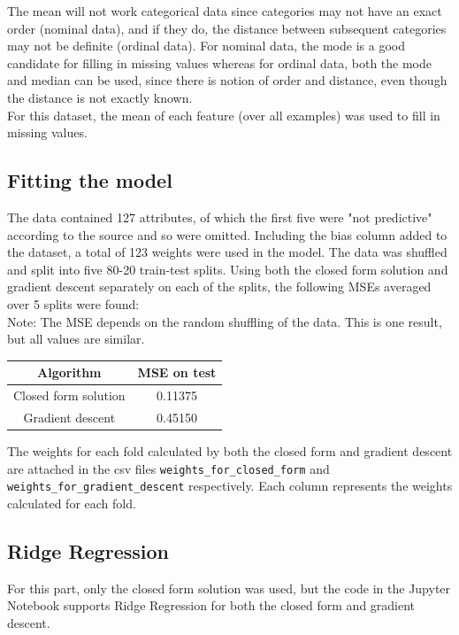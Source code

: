\documentclass[paper=a4, fontsize=11pt]{scrartcl} %
\numberwithin{equation}{section} %
\numberwithin{figure}{section} %
\numberwithin{table}{section} %
\begin{document}
The mean will not work categorical data since categories may not have an exact order (nominal data), and if they do, the distance between subsequent categories may not be definite (ordinal data). For nominal data, the mode is a good candidate for filling in missing values whereas for ordinal data, both the mode and median can be used, since there is notion of order and distance, even though the distance is not exactly known. \\

For this dataset, the mean of each feature (over all examples) was used to fill in missing values. 

\subsection{Fitting the model}
The data contained 127 attributes, of which the first five were "not predictive" according to the source and so were omitted. Including the bias column added to the dataset, a total of 123 weights were used in the model. The data was shuffled and split into five 80-20 train-test splits. Using both the closed form solution and gradient descent separately on each of the splits, the following MSEs averaged over 5 splits were found:\\

Note: The MSE depends on the random shuffling of the data. This is one result, but all values are similar.
\begin{center}
\begin{tabular}{ |c|c| } 
    \hline
    \textbf{Algorithm} & \textbf{MSE on test} \\
    \hline
    Closed form solution & 0.11375 \\
    Gradient descent & 0.45150 \\ 
    \hline
\end{tabular}
\end{center}

The weights for each fold calculated by both the closed form and gradient descent are attached in the csv files \texttt{weights\_for\_closed\_form} and \texttt{weights\_for\_gradient\_descent} respectively. Each column represents the weights calculated for each fold.

\subsection{Ridge Regression}
For this part, only the closed form solution was used, but the code in the Jupyter Notebook supports Ridge Regression for both the closed form and gradient descent. \\
\end{document}

